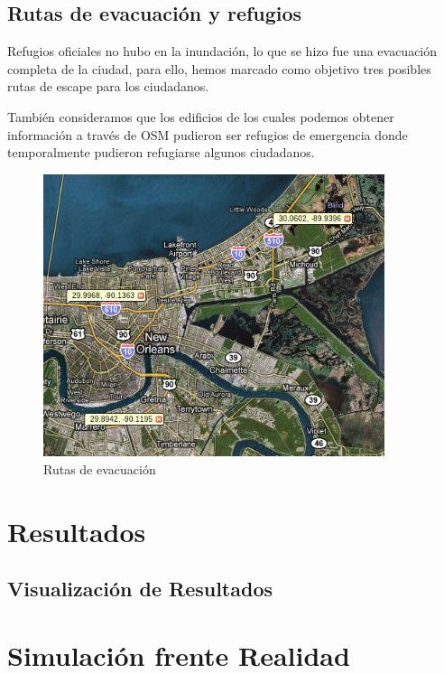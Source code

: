 \subsection*{Rutas de evacuación y refugios}

Refugios oficiales no hubo en la inundación, lo que se hizo fue una evacuación
completa de la ciudad, para ello, hemos marcado como objetivo tres posibles
rutas de escape para los ciudadanos.

También consideramos que los edificios de los cuales podemos obtener
información a través de OSM pudieron ser refugios de emergencia donde
temporalmente pudieron refugiarse algunos ciudadanos.

\begin{figure}[H]
 \centering
 \includegraphics[width=100mm]{figuras/cap6/evacuation.png}
 \caption{Rutas de evacuación}
\end{figure}

\section*{Resultados}
\subsection*{Visualización de Resultados}
\section*{Simulación frente Realidad}

